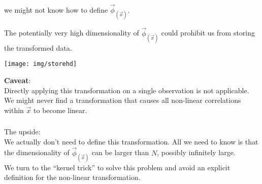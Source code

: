 \begin{frame}\frametitle{\secname}

\pause
{} we might not know how to define $\vec \phi_{(\vec x)}$.

\pause

The potentially very high dimensionality of $\vec \phi_{(\vec x)}$ could prohibit us from storing the transformed data.\\

\begin{center}
	\texttt{[image: img/storehd]}%
\end{center}



\pause

\svspace{5mm}

\textbf{Caveat}:\\
Directly applying this transformation on a single observation is not applicable. 
We might never find a transformation that causes all non-linear correlations within $\vec x$ to become linear.\\

\end{frame}

\begin{frame}\frametitle{\secname}

The upside:\\

We actually don't need to define this transformation.
All we need to know is that the dimensionality of $\vec{\phi}_{(\vec{x})}$ can be larger than $N$, possibly infinitely large.\\

We turn to the ``kernel trick'' to solve this problem and avoid an explicit definition for the non-linear transformation.

\end{frame}
